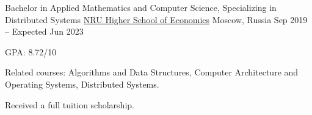 

\begin{cventries}

  \cventry
  {Bachelor in Applied Mathematics and Computer Science, Specializing in Distributed Systems} %
  {\href{https://www.hse.ru/en/}{NRU Higher School of Economics}} %
  {Moscow, Russia} %
  {Sep 2019 -- Expected Jun 2023} %
  {
    \begin{cvitems} %
      \item GPA: 8.72/10
      \item Related courses:
      Algorithms and Data Structures,
      Computer Architecture and Operating Systems,
      Distributed Systems.
      \item Received a full tuition scholarship.
    \end{cvitems}
  }

\end{cventries}
